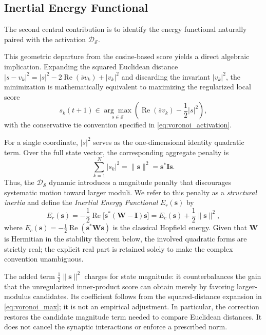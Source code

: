\documentclass[10pt,journal,letterpaper]{IEEEtran}
\begin{document}
\subsection{Inertial Energy Functional}

The second central contribution is to identify the energy functional naturally
paired with the activation $\mathcal{D}_{\mathcal{S}}$.

This geometric departure from the cosine-based score yields a direct algebraic 
implication. Expanding the squared Euclidean distance 
$|s - v_k|^2 = |s|^2 - 2\operatorname{Re}(\overline{s} v_k) + |v_k|^2$ and 
discarding the invariant $|v_k|^2$, the minimization is mathematically equivalent to 
maximizing the regularized local score
\begin{equation}
    s_k(t+1) \in \underset{s \in \mathcal{S}}{\arg\max}
               \left( \operatorname{Re}(\overline{s} v_k) - \frac{1}{2} |s|^2 \right),
\label{eq:voronoi_max}
\end{equation}
with the conservative tie convention specified in \eqref{eq:voronoi_activation}.

For a single coordinate, $|s|^2$ serves as the one-dimensional identity quadratic term. Over the full state vector, the corresponding aggregate penalty is
\begin{equation}
    \sum_{k=1}^N |s_k|^2 = \|\boldsymbol{s}\|^2 = \boldsymbol{s}^*\boldsymbol{I}\boldsymbol{s}.
\end{equation}
Thus, the $\mathcal{D}_{\mathcal{S}}$ dynamic introduces a magnitude penalty
that discourages systematic motion toward larger moduli. We refer to this
penalty as a \textit{structural inertia} and define the \textit{Inertial Energy
Functional} $E_r(\boldsymbol{s})$ by
\begin{equation}
    E_r(\boldsymbol{s}) = -\frac{1}{2}\operatorname{Re}\!\bigl[\boldsymbol{s}^* (\boldsymbol{W} - \boldsymbol{I}) \boldsymbol{s}\bigr] 
                        = E_c(\boldsymbol{s}) + \frac{1}{2}\|\boldsymbol{s}\|^2,
\label{eq:energy_reg}
\end{equation}
where $E_c(\boldsymbol{s}) = -\frac{1}{2} \operatorname{Re}(\boldsymbol{s}^* \boldsymbol{W} \boldsymbol{s})$ is the classical Hopfield energy. Given that $\boldsymbol{W}$ is Hermitian in the stability theorem below, the involved quadratic forms are strictly real; the explicit real part is retained solely to make the complex convention unambiguous.

The added term $\tfrac12\|\boldsymbol{s}\|^2$ charges for state magnitude:
it counterbalances the gain that the unregularized inner-product score can
obtain merely by favoring larger-modulus candidates. Its coefficient follows
from the squared-distance expansion in \eqref{eq:voronoi_max}; it is not an
empirical adjustment. In particular, the correction restores the candidate
magnitude term needed to compare Euclidean distances. It does not cancel the
synaptic interactions or enforce a prescribed norm.
\end{document}
